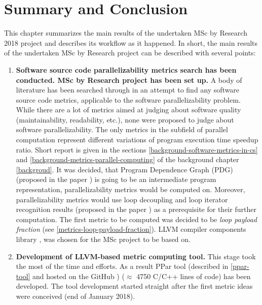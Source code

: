 \chapter{Summary and Conclusion}
\label{results}
\qquad This chapter summarizes the main results of the undertaken MSc by Research 2018 project and describes its workflow as it happened. In short, the main results of the undertaken MSc by Research project can be described with several points:
\begin{enumerate}[align=left,leftmargin=*]
\item \textbf{Software source code parallelizability metrics search has been conducted. MSc by Research project has been set up.}\newline
\null\qquad A body of literature has been searched through in an attempt to find any software source code metrics, applicable to the software parallelizability problem. While there are a lot of metrics aimed at judging about software quality (maintainability, readability, etc.), none were proposed to judge about software parallelizability. The only metrics in the subfield of parallel computation represent different variations of program execution time speedup ratio. Short report is given in the sections \ref{background-software-metrics-in-cs} and \ref{background-metrics-parallel-computing} of the background chapter \ref{backgroud}.\newline
\null\qquad It was decided, that Program Dependence Graph (PDG) (proposed in the paper \cite{pdg-paper}) is going to be an intermediate program representation, parallelizability metrics would be computed on. Moreover, parallelizability metrics would use loop decoupling and loop iterator recognition results (proposed in the paper \cite{iterator-recognition-paper}) as a prerequisite for their further computation. The first metric to be computed was decided to be \textit{loop payload fraction} (see \ref{metrics-loop-payload-fraction}). LLVM compiler components library \cite{llvm-official-website},\cite{llvm-paper} was chosen for the MSc project to be based on.	
\item \textbf{Development of LLVM-based metric computing tool.}\newline 
\null\qquad This stage took the most of the time and efforts. As a result PPar tool (described in \ref{ppar-tool} and hosted on the GitHub \cite{ppar-tool}) ($\approx$ 4750 C/C++ lines of code) has been developed. The tool development started straight after the first metric ideas were conceived (end of January 2018).\newline

\end{enumerate}
